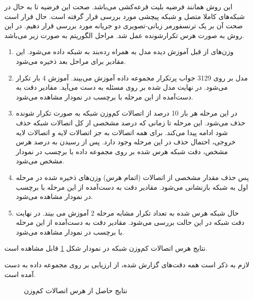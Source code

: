 این روش همانند فرضیه بلیت قرعه‌کشی
می‌باشد. صحت این فرضیه تا به حال در شبکه‌های کاملا متصل و شبکه پیچشی مورد بررسی قرار گرفته است. حال قرار است صحت آن بر یک ترنسفورمر زبانی-تصویری دو جریانه
 مورد بررسی قرار دهیم.
در این روش به صورت هرس تکرارشونده
عمل شد. مراحل الگوریتم به صورت زیر می‌باشد.
\begin{enumerate}
	\item وزن‌های از قبل آموزش دیده مدل
	به همراه رده‌بند
	به شبکه داده می‌شود. این مقادیر برای مراحل بعد ذخیره می‌شود.
	\item مدل بر روی 3129 جواب پرتکرار مجموعه داده
	آموزش می‌بیند. آموزش  4 بار تکرار
	می‌شود. در نهایت مدل
	شده بر روی مسئله
 به دست می‌آید.	مقادیر دقت به دست‌آمده از این مرحله با برچسب
 در نمودار‌ مشاهده می‌شود.
	\item
	در این مرحله هر بار 10 درصد از اتصالات کم‌وزن شبکه به صورت تکرار شونده حذف می‌شود. این مرحله تا زمانی که درصد مشخصی از کل اتصالات شبکه حذف شود ادامه پیدا می‌کند. برای همه اتصالات به جز اتصالات لایه 
	و اتصالات لایه خروجی، احتمال حذف در این مرحله وجود دارد. پس از رسیدن به درصد هرس مشخص، دقت شبکه هرس شده بر روی مجموعه داده 
	با برچسب 
	در نمودار مشخص می‌شود.
	\item پس حذف مقدار مشخصی از اتصالات (اتمام هرس) وزن‌های ذخیره شده در مرحله اول به شبکه بازنشانی
	 می‌شود. مقادیر دقت به دست‌آمده از این مرحله با برچسب
	در نمودار‌ مشاهده می‌شود.
	\item حال شبکه هرس شده به تعداد تکرار مشابه مرحله 2 آموزش می بیند. در نهایت دقت شبکه در این حالت بررسی می‌شود. مقادیر دقت به دست‌آمده از این مرحله با برچسب
	در نمودار‌ مشاهده می‌شود.
\end{enumerate}

نتایج هرس اتصالات کم‌وزن شبکه
 در نمودار شکل \ref{low_pruning} قابل مشاهده است.

لازم به ذکر است همه دقت‌های گزارش شده، از ارزیابی بر روی مجموعه داده 
به دست آمده است.

\begin{figure}[H]
	\caption{نتایج حاصل از هرس اتصالات کم‌وزن}
	\label{low_pruning}
\end{figure}



